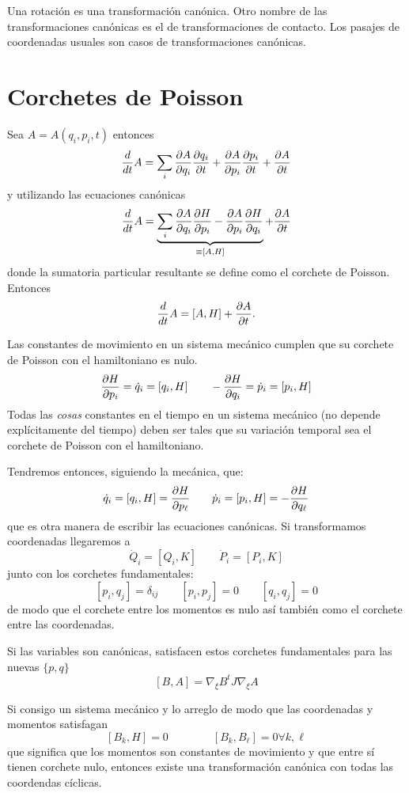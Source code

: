 \documentclass[10pt,oneside]{CBFT_book}
\begin{document}
Una rotación es una transformación canónica.
Otro nombre de las transformaciones canónicas es el de transformaciones de contacto.
Los pasajes de coordenadas usuales son casos de transformaciones canónicas.

\section{Corchetes de Poisson}

Sea $A=A(q_i,p_i,t)$ entonces
\[
	\frac{d}{dt}A = \sum_i \frac{\partial^{\hspace{-0.05em}} {A}}{\partial {q_i}^{\hspace{-0.05em}}} \frac{\partial^{\hspace{-0.05em}} {q_i}}{\partial {t}^{\hspace{-0.05em}}} + \frac{\partial^{\hspace{-0.05em}} {A}}{\partial {p_i}^{\hspace{-0.05em}}} \frac{\partial^{\hspace{-0.05em}} {p_i}}{\partial {t}^{\hspace{-0.05em}}} + \frac{\partial^{\hspace{-0.05em}} {A}}{\partial {t}^{\hspace{-0.05em}}}
\]
y utilizando las ecuaciones canónicas
\[
	\frac{d}{dt}A = \underbrace{\sum_i \frac{\partial^{\hspace{-0.05em}} {A}}{\partial {q_i}^{\hspace{-0.05em}}} \frac{\partial^{\hspace{-0.05em}} {H}}{\partial {p_i}^{\hspace{-0.05em}}} - \frac{\partial^{\hspace{-0.05em}} {A}}{\partial {p_i}^{\hspace{-0.05em}}} \frac{\partial^{\hspace{-0.05em}} {H}}{\partial {q_i}^{\hspace{-0.05em}}}}_{\equiv [A,H]} + 
\frac{\partial^{\hspace{-0.05em}} {A}}{\partial {t}^{\hspace{-0.05em}}}
\]
donde la sumatoria particular resultante se define como el corchete de Poisson.
Entonces
\[
	\frac{d}{dt}A = [A,H] + \frac{\partial^{\hspace{-0.05em}} {A}}{\partial {t}^{\hspace{-0.05em}}}.
\]

Las constantes de movimiento en un sistema mecánico cumplen que su corchete de Poisson con el hamiltoniano es nulo.
\[
	\frac{\partial^{\hspace{-0.05em}} {H}}{\partial {p_i}^{\hspace{-0.05em}}} = \dot{q}_i = [q_i,H] \qquad  -\frac{\partial^{\hspace{-0.05em}} {H}}{\partial {q_i}^{\hspace{-0.05em}}} = \dot{p}_i = [p_i,H]
\]
Todas las {\it cosas} constantes en el tiempo en un sistema mecánico (no depende explícitamente del tiempo) deben
ser tales que su variación temporal sea el corchete de Poisson con el hamiltoniano.

Tendremos entonces, siguiendo la mecánica, que:
\[
	\dot{q}_i = [q_i,H] = \frac{\partial^{\hspace{-0.05em}} {H}}{\partial {p_\ell}^{\hspace{-0.05em}}} \qquad \dot{p}_i = [p_i,H] = -\frac{\partial^{\hspace{-0.05em}} {H}}{\partial {q_\ell}^{\hspace{-0.05em}}}
\]
que es otra manera de escribir las ecuaciones canónicas.
Si transformamos coordenadas llegaremos a 
\[
	\dot{Q}_i = [ Q_i, K ] \qquad \dot{P}_i = [ P_i, K ]
\]
junto con los corchetes fundamentales:
\[
	[p_i,q_j] = \delta_{ij} \qquad [p_i,p_j] = 0 \qquad [q_i,q_j] = 0
\]
de modo que el corchete entre los momentos es nulo así también como el corchete entre las coordenadas.

Si las variables son canónicas, satisfacen estos corchetes fundamentales para las nuevas $\{p,q\}$
\[
	[B,A] = \nabla_\xi B^t J \nabla_\xi A
\]

Si consigo un sistema mecánico y lo arreglo de modo que las coordenadas y momentos satisfagan 
\[
	[B_k, H ] = 0 \qquad \qquad  [B_k, B_\ell ] = 0 \forall k,\ell
\]
que significa que los momentos son constantes de movimiento y que entre sí tienen corchete nulo, entonces
existe una transformación canónica con todas las coordendas cíclicas.
\end{document}
